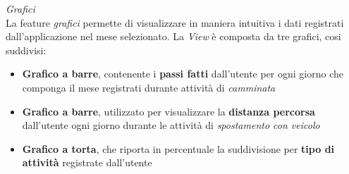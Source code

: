 \documentclass{article}
\begin{document}
\begin{center}
    \begin{figure}[H]
        \centering
    \end{figure}
\end{center}
\textit{Grafici} \vspace*{7pt}\\
La feature \textit{grafici} permette di visualizzare in maniera intuitiva i dati registrati dall'applicazione nel mese selezionato. La \textit{View} è composta da tre grafici, cosi suddivisi:
\begin{itemize}
    \renewcommand{\labelitemi}{-}
    \item \textbf{Grafico a barre}, contenente i \textbf{passi fatti} dall'utente per ogni giorno che componga il mese registrati durante attività di \textit{camminata}
    \item \textbf{Grafico a barre}, utilizzato per visualizzare la \textbf{distanza percorsa} dall'utente ogni giorno durante le attività di \textit{spostamento con veicolo}
    \item \textbf{Grafico a torta}, che riporta in percentuale la suddivisione per \textbf{tipo di attività} registrate dall'utente
\end{itemize}
\end{document}
